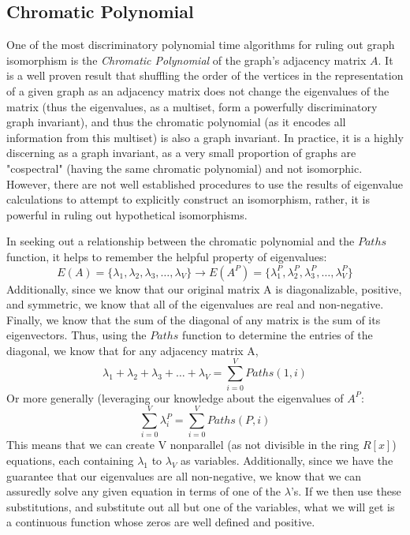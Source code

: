 \documentclass[11pt,a4paper]{report}
\begin{document}
\subsection{Chromatic Polynomial}
One of the most discriminatory polynomial time algorithms for ruling out graph isomorphism is the \emph{Chromatic Polynomial} of the graph's adjacency matrix \(A\).
It is a well proven result that shuffling the order of the vertices in the representation of a given graph as an adjacency matrix does not change the eigenvalues of the matrix (thus the eigenvalues, as a multiset, form a powerfully discriminatory graph invariant), and thus the chromatic polynomial (as it encodes all information from this multiset) is also a graph invariant.
In practice, it is a highly discerning as a graph invariant, as a very small proportion of graphs are "cospectral" (having the same chromatic polynomial) and not isomorphic.
However, there are not well established procedures to use the results of eigenvalue calculations to attempt to explicitly construct an isomorphism, rather, it is powerful in ruling out hypothetical isomorphisms. 

In seeking out a relationship between the chromatic polynomial and the \(Paths\) function, it helps to remember the helpful property of  eigenvalues:
\[E(A) = \{\lambda_1,\lambda_2,\lambda_3, \dots, \lambda_V\} \rightarrow E(A^P) = \{\lambda_1^P,\lambda_2^P,\lambda_3^P, \dots, \lambda_V^P\} \]
Additionally, since we know that our original matrix A is diagonalizable, positive, and symmetric, we know that all of the eigenvalues are real and non-negative. 
Finally, we know that the sum of the diagonal of any matrix is the sum of its eigenvectors. 
Thus, using the \(Paths\) function to determine the entries of the diagonal, we know that for any adjacency matrix A,
\[\lambda_1 + \lambda_2 + \lambda_3 + \dots + \lambda_V = \sum_{i = 0}^{V}{Paths(1, i)}\]
Or more generally (leveraging our knowledge about the eigenvalues of \(A^P\):
\[ \sum_{i = 0}^V{\lambda_i^P} =  \sum_{i = 0}^{V}{Paths(P, i)}\]
This means that we can create V nonparallel (as not divisible in the ring \(R[x]\)) equations, each containing \(\lambda_1\) to \(\lambda_V\) as variables.
Additionally, since we have the guarantee that our eigenvalues are all non-negative, we know that we can assuredly solve any given equation in terms of one of the \(\lambda\)'s.
If we then use these substitutions, and substitute out all but one of the variables, what we will get is a continuous function whose zeros are well defined and positive. 
\end{document}
